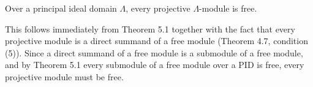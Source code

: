 Over a principal ideal domain $\Lambda$, every projective $\Lambda$-module is free.

This follows immediately from Theorem 5.1 together with the fact that every projective module is a direct summand of a free module (Theorem 4.7, condition (5)). Since a direct summand of a free module is a submodule of a free module, and by Theorem 5.1 every submodule of a free module over a PID is free, every projective module must be free.
